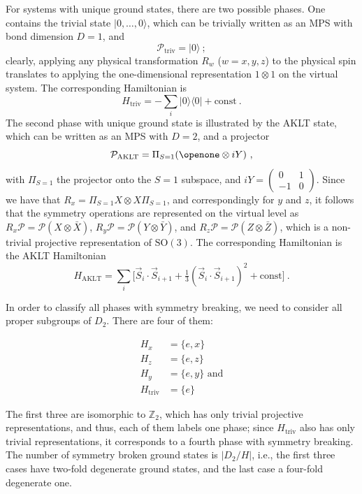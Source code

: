 \documentclass[twocolumn,superscriptaddress,prb,linenumbers]{revtex4-1}
\newcommand{\ket}[1]{\vert#1\rangle}
\newcommand{\bra}[1]{\langle#1\vert}
\newcommand{\mc}[1]{\mathcal{#1}}
\begin{document}
For systems with unique ground states, there are two possible phases.
One contains the trivial state
$\ket{0,\dots ,0}$,
which can be trivially written as an MPS with bond dimension $D=1$, and
\[\mc P_\mathrm{triv} = \ket{0}\ ;
\]
clearly, applying any physical transformation $R_w$ ($w=x,y,z$) to the
physical spin translates to applying the one-dimensional
representation $1\otimes 1$ on the virtual system. The corresponding
Hamiltonian is
\begin{equation}
    \label{eq:example-D2-triv-parent}
    H_\mathrm{triv} = -\sum_i \ket{0}\bra{0} + \mathrm{const}\ .
\end{equation}
The second phase with unique ground state is illustrated by the
AKLT state,~\cite{aklt} which can be written as an MPS with $D=2$, and a
projector
\[
    \mc P_\mathrm{AKLT} = \Pi_{S=1} (\openone \otimes iY)\ ,
\]
with $\Pi_{S=1}$ the projector onto the $S=1$ subspace, and $iY=
    \left(\begin{smallmatrix}0&1\\-1&0\end{smallmatrix}\right)$. Since we
have that $R_x = \Pi_{S=1} X\otimes X\Pi_{S=1}$, and correspondingly for
$y$ and $z$, it follows that the symmetry operations are represented on
the virtual level as $R_x \mc P = \mc P(X\otimes \bar X)$, $R_y \mc P =
    \mc P(Y\otimes \bar Y)$,  and $R_z \mc P = \mc P(Z\otimes \bar Z)$, which
is a non-trivial projective representation of $\mathrm{SO(3)}$.   The
corresponding Hamiltonian is the AKLT Hamiltonian
\[
    H_{\mathrm{AKLT}} = \sum_i \big[\vec S_i\cdot \vec S_{i+1} +
        \tfrac13 (\vec S_i\cdot \vec S_{i+1})^2+\mathrm{const}\big]\ .
\]

In order to classify all phases with symmetry breaking, we need to
consider all proper subgroups of $D_2$. There are four of them:
\begin{linenomath}
    \begin{align*}
        H_x               & =\{e,x\}              \\
        H_z               & =\{e,z\}              \\
        H_y               & =\{e,y\} \mbox{\ and} \\
        H_{\mathrm{triv}} & = \{e\}
    \end{align*}
\end{linenomath}
The first three are isomorphic to $\mathbb Z_2$, which has only trivial
projective representations, and thus, each of them labels one phase; since
$H_\mathrm{triv}$ also has only trivial representations, it corresponds to
a fourth phase with symmetry breaking.  The number of
symmetry broken ground states is $|D_2/H|$, i.e., the first three
cases have two-fold degenerate ground states, and the last case a
four-fold degenerate one.
\end{document}
